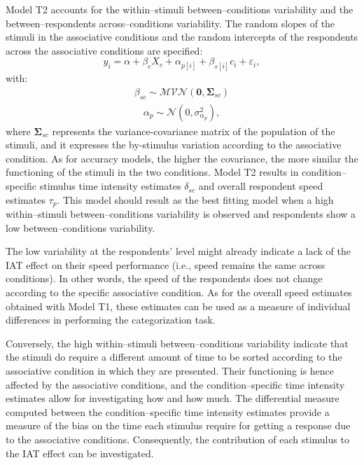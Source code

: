 \documentclass[12pt]{book}
\begin{document}
Model T2 accounts for the within--stimuli between--conditions variability and the between--respondents across--conditions variability. 
The random slopes of the stimuli in the associative conditions and the random intercepts of the respondents across the associative conditions are specified:  
\begin{equation}\label{Logtime2}
	y_{i} = \alpha + \beta_cX_c + \alpha_{p[i]} +  \beta_{s[i]}c_{i} + \varepsilon_{i},
\end{equation}
with:
\begin{align}
	\beta_{sc} \sim \mathcal{MVN}(\bm{0}, \bm{\Sigma}_{sc})
\end{align}
\begin{align}
	\alpha_{p} \sim  \mathcal{N} (0, \sigma_{\alpha_p}^2),
\end{align}
where $\bm{\Sigma}_{sc}$ represents the variance-covariance matrix of the population of the stimuli, and it expresses the by-stimulus variation according to the associative condition. As for accuracy models, the higher the covariance, the more similar the functioning of the stimuli in the two conditions.
Model T2 results in condition--specific stimulus time intensity estimates $\delta_{sc}$ and overall respondent speed estimates $\tau_{p}$. This model should result as the best fitting model when a high within--stimuli between--conditions variability is observed and respondents show a low between--conditions variability. 

The low variability at the respondents' level might already indicate a lack of the IAT effect on their speed performance (i.e., speed remains the same across conditions). In other words, the speed of the respondents does not change according to the specific associative condition. As for the overall speed estimates obtained with Model T1, these estimates can be used as a measure of individual differences in performing the categorization task.

Conversely, the high within--stimuli between--conditions variability indicate that the stimuli do require a different amount of time to be sorted according to the associative condition in which they are presented. Their functioning is hence affected by the associative conditions, and the condition--specific time intensity estimates allow for investigating how and how much. 
The differential measure computed between the condition--specific time intensity estimates provide a measure of the bias on the time each stimulus require for getting a response due to the associative conditions. Consequently, the contribution of each stimulus to the IAT effect can be investigated. 
\end{document}
